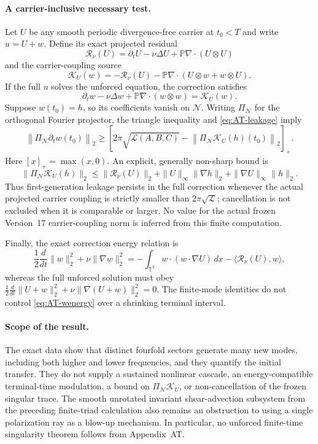 \paragraph{A carrier-inclusive necessary test.}
Let $U$ be any smooth periodic divergence-free carrier at
$t_0<T$ and write $u=U+w$. Define its exact projected residual
\[
 \mathcal R_\nu(U)
 =\partial_tU-\nu\Delta U+
   \mathbb P\nabla\cdot(U\otimes U)
\]
and the carrier-coupling source
\[
 \mathcal K_U(w)
 =-\mathcal R_\nu(U)
  -\mathbb P\nabla\cdot(U\otimes w+w\otimes U).
\]
If the full $u$ solves the unforced equation, the correction
satisfies
\[
 \partial_tw-\nu\Delta w+
 \mathbb P\nabla\cdot(w\otimes w)=\mathcal K_U(w).
\]
Suppose $w(t_0)=h$, so its coefficients vanish on $\mathcal N$.
Writing $\Pi_{\mathcal N}$ for the orthogonal Fourier projector,
the triangle inequality and \eqref{eq:AT-leakage} imply
\begin{equation}\label{eq:AT-carrier}
 \left\|\Pi_{\mathcal N}\partial_tw(t_0)\right\|_2
 \ge\left[
 2\pi\sqrt{\mathcal L(A,B,C)}
 -\left\|\Pi_{\mathcal N}\mathcal K_U(h)(t_0)\right\|_2
 \right]_+ .
\end{equation}
Here $[x]_+=\max(x,0)$.
An explicit, generally non-sharp bound is
\[
 \|\Pi_{\mathcal N}\mathcal K_U(h)\|_2
 \le \|\mathcal R_\nu(U)\|_2
    +\|U\|_\infty\|\nabla h\|_2
    +\|\nabla U\|_\infty\|h\|_2 .
\]
Thus first-generation leakage persists in the full correction
whenever the actual projected carrier coupling is strictly
smaller than $2\pi\sqrt{\mathcal L}$; cancellation is not
excluded when it is comparable or larger. No value for the
actual frozen Version~17 carrier-coupling norm is inferred
from this finite computation.

Finally, the exact correction energy relation is
\begin{equation}\label{eq:AT-wenergy}
 \frac12\frac{d}{dt}\|w\|_2^2+\nu\|\nabla w\|_2^2
 =-\int_{\mathbb T^3}w\cdot(w\cdot\nabla U)\,dx
   -\langle\mathcal R_\nu(U),w\rangle ,
\end{equation}
whereas the full unforced solution must obey
$\frac12\frac{d}{dt}\|U+w\|_2^2+
\nu\|\nabla(U+w)\|_2^2=0$.
The finite-mode identities do not control
\eqref{eq:AT-wenergy} over a shrinking terminal interval.

\paragraph{Scope of the result.}
The exact data show that distinct fourfold sectors generate
many new modes, including both higher and lower frequencies,
and they quantify the initial transfer. They do not supply
a sustained nonlinear cascade, an energy-compatible
terminal-time modulation, a bound on
$\Pi_{\mathcal N}\mathcal K_U$, or non-cancellation of the
frozen singular trace. The smooth unrotated invariant
shear-advection subsystem from the preceding finite-triad
calculation also remains an obstruction to using a single
polarization ray as a blow-up mechanism. In particular, no
unforced finite-time singularity theorem follows from
Appendix~AT.
